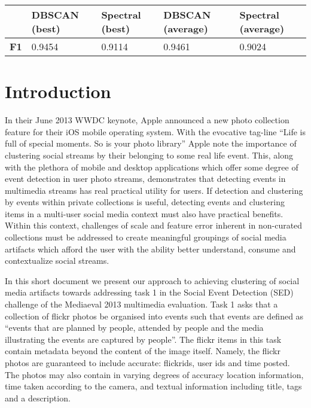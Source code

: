 \documentclass{../acm_proc_article-me11_tweaked}
\begin{document}
\begin{table*}[t!]
\centering
    \begin{tabular}{l|l|l|l|l}
    ~                  & \textbf{DBSCAN (best)} &  \textbf{Spectral (best)} & \textbf{DBSCAN (average)} & \textbf{Spectral (average)} \\
    \hline
    \hline
    \textbf{F1}                 & 0.9454        & 0.9114           & 0.9461           & 0.9024             \\
    \end{tabular}
\end{table*}
\section{Introduction}
In their June 2013 WWDC keynote, Apple announced a new photo collection feature for their iOS mobile operating system. With the evocative tag-line ``Life is full of special moments. So is your photo library'' Apple note the importance of clustering social streams by their belonging to some real life event. This, along with the plethora of mobile and desktop applications which offer some degree of event detection in user photo streams, demonstrates that detecting events in multimedia streams has real practical utility for users. If detection and clustering by events within private collections is useful, detecting events and clustering items in a multi-user social media context must also have practical benefits. Within this context, challenges of scale and feature error inherent in non-curated collections must be addressed to create meaningful groupings of social media artifacts which afford the user with the ability better understand, consume and contextualize social streams. 

In this short document we present our approach to achieving clustering of social media artifacts towards addressing task 1 in the Social Event Detection (SED) challenge of the Mediaeval 2013 multimedia evaluation. Task 1 asks that a collection of flickr photos be organised into events such that events are defined as ``events that are planned by people, attended by people and the media illustrating the events are captured by people''. The flickr items in this task contain metadata beyond the content of the image itself. Namely, the flickr photos are guaranteed to include accurate: flickrids, user ids and time posted. The photos may also contain in varying degrees of accuracy location information, time taken according to the camera, and textual information including title, tags and a description. 
\end{document}
